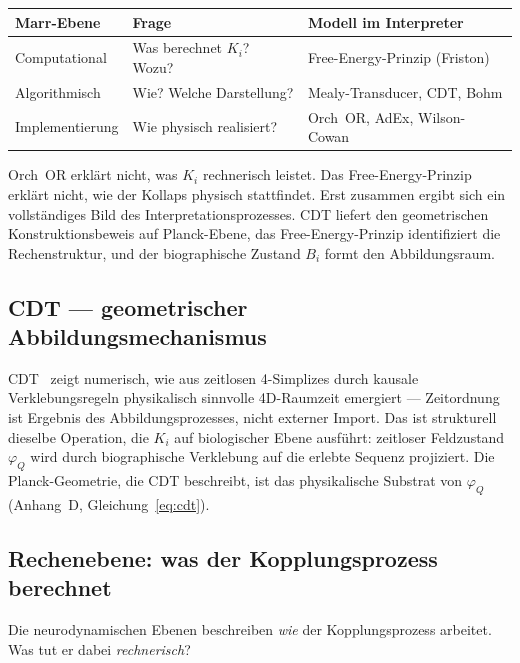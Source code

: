 \documentclass[11pt,a4paper]{article}
\begin{document}
\medskip
\begin{center}\small
\begin{tabular}{@{}p{3.2cm}p{4.8cm}p{5.2cm}@{}}
\toprule
Marr-Ebene & Frage & Modell im Interpreter \\
\midrule
Computational   & Was berechnet $K_i$? Wozu?      & Free-Energy-Prinzip (Friston) \\
Algorithmisch   & Wie? Welche Darstellung?         & Mealy-Transducer, CDT, Bohm \\
Implementierung & Wie physisch realisiert?         & Orch~OR, AdEx, Wilson-Cowan \\
\bottomrule
\end{tabular}
\end{center}
\medskip

Orch~OR erklärt nicht, was $K_i$ rechnerisch leistet. Das Free-Energy-Prinzip
erklärt nicht, wie der Kollaps physisch stattfindet. Erst zusammen ergibt
sich ein vollständiges Bild des Interpretationsprozesses.
CDT liefert den geometrischen Konstruktionsbeweis auf Planck-Ebene,
das Free-Energy-Prinzip identifiziert die Rechenstruktur, und der
biographische Zustand $B_i$ formt den Abbildungsraum.

\subsection*{CDT — geometrischer Abbildungsmechanismus}

CDT~\citep{ambjorn2004} zeigt numerisch, wie aus zeitlosen 4-Simplizes durch
kausale Verklebungsregeln physikalisch sinnvolle 4D-Raumzeit emergiert —
Zeitordnung ist Ergebnis des Abbildungsprozesses, nicht externer Import.
Das ist strukturell dieselbe Operation, die $K_i$ auf biologischer Ebene
ausführt: zeitloser Feldzustand $\varphi_Q$ wird durch biographische
Verklebung auf die erlebte Sequenz projiziert. Die Planck-Geometrie, die CDT
beschreibt, ist das physikalische Substrat von $\varphi_Q$
(Anhang~D, Gleichung~\eqref{eq:cdt}).

\subsection*{Rechenebene: was der Kopplungsprozess berechnet}

Die neurodynamischen Ebenen beschreiben \emph{wie} der Kopplungsprozess arbeitet.
Was tut er dabei \emph{rechnerisch}?
\end{document}
